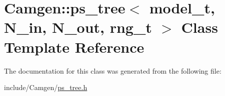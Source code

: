 \hypertarget{a00455}{}\section{Camgen\+:\+:ps\+\_\+tree$<$ model\+\_\+t, N\+\_\+in, N\+\_\+out, rng\+\_\+t $>$ Class Template Reference}
\label{a00455}


The documentation for this class was generated from the following file\+:\begin{DoxyCompactItemize}
\item 
include/\+Camgen/\hyperlink{a00744}{ps\+\_\+tree.\+h}\end{DoxyCompactItemize}
